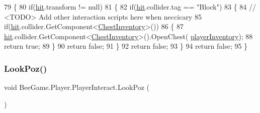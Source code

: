 \begin{DoxyCode}
79         \{
80             \textcolor{keywordflow}{if}(\hyperlink{class_bee_game_1_1_player_1_1_player_interact_a39537118b4601a3596122f124b684024}{hit}.transform != null)
81             \{
82                 \textcolor{keywordflow}{if}(\hyperlink{class_bee_game_1_1_player_1_1_player_interact_a39537118b4601a3596122f124b684024}{hit}.collider.tag == \textcolor{stringliteral}{"Block"})
83                 \{
84                     \textcolor{comment}{// <TODO> Add other interaction scripts here when neccicary}
85                     \textcolor{keywordflow}{if}(\hyperlink{class_bee_game_1_1_player_1_1_player_interact_a39537118b4601a3596122f124b684024}{hit}.collider.GetComponent<\hyperlink{class_bee_game_1_1_inventory_1_1_chest_inventory}{ChestInventory}>())
86                     \{
87                         \hyperlink{class_bee_game_1_1_player_1_1_player_interact_a39537118b4601a3596122f124b684024}{hit}.collider.GetComponent<\hyperlink{class_bee_game_1_1_inventory_1_1_chest_inventory}{ChestInventory}>().OpenChest(
      \hyperlink{class_bee_game_1_1_player_1_1_player_interact_af158edc4bacd34c13fffaa1fe4839de2}{playerInventory});
88                         \textcolor{keywordflow}{return} \textcolor{keyword}{true};
89                     \}
90                     \textcolor{keywordflow}{return} \textcolor{keyword}{false};
91                 \}
92                 \textcolor{keywordflow}{return} \textcolor{keyword}{false};
93             \}
94             \textcolor{keywordflow}{return} \textcolor{keyword}{false};
95         \}
\end{DoxyCode}
\mbox{\label{class_bee_game_1_1_player_1_1_player_interact_aacd8f7a70e55d018285ac5f0fd799fd9}} 
\subsubsection{\texorpdfstring{Look\+Poz()}{LookPoz()}}
{\footnotesize\ttfamily void Bee\+Game.\+Player.\+Player\+Interact.\+Look\+Poz (\begin{DoxyParamCaption}{ }\end{DoxyParamCaption})\hspace{0.3cm}{\ttfamily [private]}}




